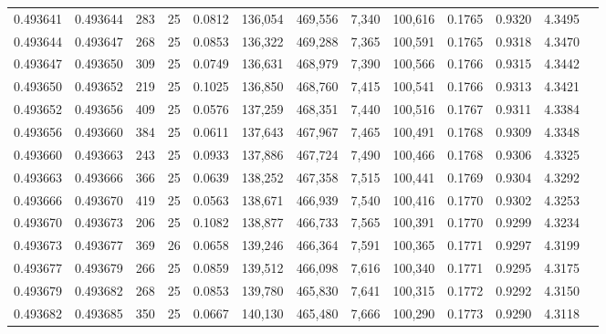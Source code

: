 \begin{tabular}{rrrrrrrrrrrrr}
0.493641 & 0.493644 &   283 &  25 &                                     0.0812 & 136,054 & 469,556 &   7,340 & 100,616 & 0.1765 & 0.9320 & 4.3495 \\
0.493644 & 0.493647 &   268 &  25 &                                     0.0853 & 136,322 & 469,288 &   7,365 & 100,591 & 0.1765 & 0.9318 & 4.3470 \\
0.493647 & 0.493650 &   309 &  25 &                                     0.0749 & 136,631 & 468,979 &   7,390 & 100,566 & 0.1766 & 0.9315 & 4.3442 \\
0.493650 & 0.493652 &   219 &  25 &                                     0.1025 & 136,850 & 468,760 &   7,415 & 100,541 & 0.1766 & 0.9313 & 4.3421 \\
0.493652 & 0.493656 &   409 &  25 &                                     0.0576 & 137,259 & 468,351 &   7,440 & 100,516 & 0.1767 & 0.9311 & 4.3384 \\
0.493656 & 0.493660 &   384 &  25 &                                     0.0611 & 137,643 & 467,967 &   7,465 & 100,491 & 0.1768 & 0.9309 & 4.3348 \\
0.493660 & 0.493663 &   243 &  25 &                                     0.0933 & 137,886 & 467,724 &   7,490 & 100,466 & 0.1768 & 0.9306 & 4.3325 \\
0.493663 & 0.493666 &   366 &  25 &                                     0.0639 & 138,252 & 467,358 &   7,515 & 100,441 & 0.1769 & 0.9304 & 4.3292 \\
0.493666 & 0.493670 &   419 &  25 &                                     0.0563 & 138,671 & 466,939 &   7,540 & 100,416 & 0.1770 & 0.9302 & 4.3253 \\
0.493670 & 0.493673 &   206 &  25 &                                     0.1082 & 138,877 & 466,733 &   7,565 & 100,391 & 0.1770 & 0.9299 & 4.3234 \\
0.493673 & 0.493677 &   369 &  26 &                                     0.0658 & 139,246 & 466,364 &   7,591 & 100,365 & 0.1771 & 0.9297 & 4.3199 \\
0.493677 & 0.493679 &   266 &  25 &                                     0.0859 & 139,512 & 466,098 &   7,616 & 100,340 & 0.1771 & 0.9295 & 4.3175 \\
0.493679 & 0.493682 &   268 &  25 &                                     0.0853 & 139,780 & 465,830 &   7,641 & 100,315 & 0.1772 & 0.9292 & 4.3150 \\
0.493682 & 0.493685 &   350 &  25 &                                     0.0667 & 140,130 & 465,480 &   7,666 & 100,290 & 0.1773 & 0.9290 & 4.3118 \\

\end{tabular}
